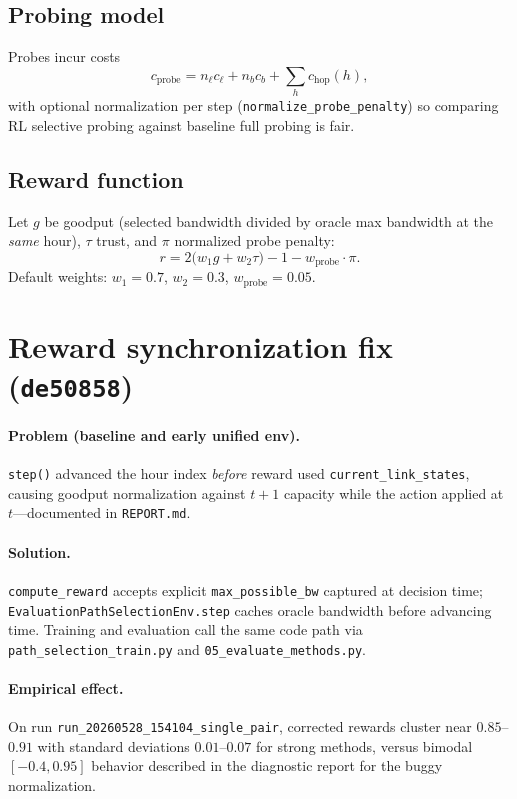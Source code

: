 \documentclass[11pt,a4paper,twoside,openright]{report}
\begin{document}
\subsection{Probing model}

Probes incur costs
\[
  c_{\mathrm{probe}} = n_{\ell} c_{\ell} + n_{b} c_{b} + \sum_{h} c_{\mathrm{hop}}(h),
\]
with optional normalization per step (\texttt{normalize\_probe\_penalty}) so comparing
RL selective probing against baseline full probing is fair.

\subsection{Reward function}

Let $g$ be goodput (selected bandwidth divided by oracle max bandwidth at the
\emph{same} hour), $\tau$ trust, and $\pi$ normalized probe penalty:
\begin{equation}
  r = 2 \bigl(w_1 g + w_2 \tau\bigr) - 1 - w_{\mathrm{probe}} \cdot \pi.
  \label{eq:reward}
\end{equation}
Default weights: $w_1{=}0.7$, $w_2{=}0.3$, $w_{\mathrm{probe}}{=}0.05$.

\section{Reward synchronization fix (\texttt{de50858})}

\paragraph{Problem (baseline and early unified env).}
\texttt{step()} advanced the hour index \emph{before} reward used
\texttt{current\_link\_states}, causing goodput normalization against $t{+}1$
capacity while the action applied at $t$---documented in \texttt{REPORT.md}.

\paragraph{Solution.}
\texttt{compute\_reward} accepts explicit \texttt{max\_possible\_bw} captured at
decision time; \texttt{EvaluationPathSelectionEnv.step} caches oracle bandwidth
before advancing time. Training and evaluation call the same code path via
\texttt{path\_selection\_train.py} and \texttt{05\_evaluate\_methods.py}.

\paragraph{Empirical effect.}
On run \texttt{run\_20260528\_154104\_single\_pair}, corrected rewards cluster near
$0.85$--$0.91$ with standard deviations $0.01$--$0.07$ for strong methods, versus
bimodal $[-0.4, 0.95]$ behavior described in the diagnostic report for the buggy
normalization.
\end{document}
